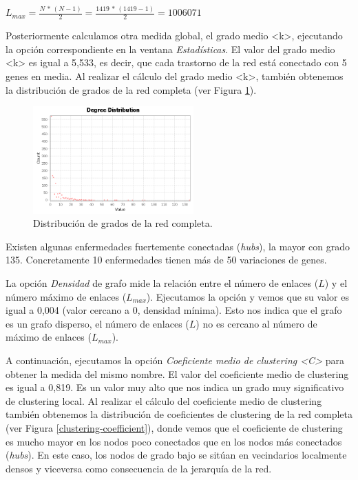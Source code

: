 \documentclass{uimppracticas}
\begin{document}
\begin{center}
	$L_{max} = \frac{N\,*\,(N-1)}{2} = \frac{1419\,*\,(1419-1)}{2} = 1006071$
\end{center}

Posteriormente calculamos otra medida global, el grado medio <k>, ejecutando la opción correspondiente en la ventana \textit{Estadísticas}. El valor del grado medio <k> es igual a 5,533, es decir, que cada trastorno de la red está conectado con 5 genes en media. Al realizar el cálculo del grado medio <k>, también obtenemos la distribución de grados de la red completa (ver Figura \ref{degree-distribution}).

\begin{figure}[H]
	\centering
	\includegraphics[width=0.55\textwidth]{images/degree-distribution}
	\caption{Distribución de grados de la red completa.}
	\label{degree-distribution}
\end{figure}

Existen algunas enfermedades fuertemente conectadas (\textit{hubs}), la mayor con grado 135. Concretamente 10 enfermedades tienen más de 50 variaciones de genes.

La opción \textit{Densidad} de grafo mide la relación entre el número de enlaces ($L$) y el número máximo de enlaces ($L_{max}$). Ejecutamos la opción y vemos que su valor es igual a 0,004 (valor cercano a 0, densidad mínima). Esto nos indica que el grafo es un grafo disperso, el número de enlaces ($L$) no es cercano al número de máximo de enlaces ($L_{max}$). 

A continuación, ejecutamos la opción \textit{Coeficiente medio de clustering <C>} para obtener la medida del mismo nombre. El valor del coeficiente medio de clustering es igual a 0,819. Es un valor muy alto que nos indica un grado muy significativo de clustering local. Al realizar el cálculo del coeficiente medio de clustering también obtenemos la distribución de coeficientes de clustering de la red completa (ver Figura \ref{clustering-coefficient}), donde vemos que el coeficiente de clustering es mucho mayor en los nodos poco conectados que en los nodos más conectados (\textit{hubs}). En este caso, los nodos de grado bajo se sitúan en vecindarios localmente densos y viceversa como consecuencia de la jerarquía de la red.
\end{document}
